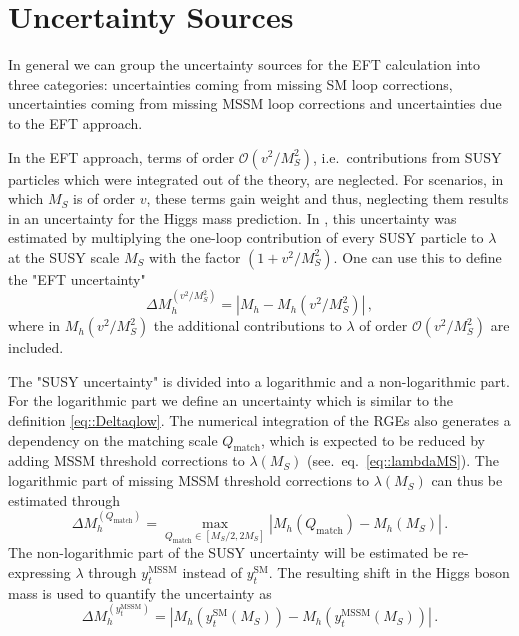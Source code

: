 \documentclass[a4paper,12pt]{book}
\begin{document}
\section{Uncertainty Sources}
In general we can group the uncertainty sources for the EFT calculation into three categories: uncertainties coming from missing SM loop corrections, uncertainties coming from missing MSSM loop corrections and uncertainties due to the EFT approach.\par 
In the EFT approach, terms of order $\mathcal{O}(v^2/M_S^2)$, i.e.\ contributions from SUSY particles which were integrated out of the theory, are neglected. For scenarios, in which $M_S$ is of order $v$, these terms gain weight and thus, neglecting them results in an uncertainty for the Higgs mass prediction. In \cite{susyhd}, this uncertainty was estimated by multiplying the one-loop contribution of every SUSY particle to $\lambda$ at the SUSY scale $M_S$ with the factor $(1+v^2/M_S^2)$. One can use this to define the "EFT uncertainty" 
\begin{equation}
\label{eq::DeltaEFT}
\Delta M_h^{(v^2/M_S^2)}=|M_h - M_h(v^2/M_S^2)|\,,
\end{equation}
where in $M_h(v^2/M_S^2)$ the additional contributions to $\lambda$ of order $\mathcal{O}(v^2/M_S^2)$ are included. \par 
The "SUSY uncertainty" is divided into a logarithmic and a non-logarithmic part. For the logarithmic part we define an uncertainty which is similar to the definition \eqref{eq::Deltaqlow}. The numerical integration of the RGEs also generates a dependency on the matching scale $Q_\text{match}$, which is expected to be reduced by adding MSSM threshold corrections to $\lambda(M_S)$ (see.\ eq.\ \eqref{eq::lambdaMS}). The logarithmic part of missing MSSM threshold corrections to $\lambda(M_S)$ can thus be estimated through 
\begin{equation}
\label{eq::Deltaqmatch}
\Delta M_h^{(Q_\text{match})}= \max_{Q_\text{match} \in [M_S/2,2 M_S]} |M_h(Q_\text{match}) - M_h(M_S)|\,.
\end{equation}
The non-logarithmic part of the SUSY uncertainty will be estimated be re-expressing $\lambda$ through $y_t^\text{MSSM}$ instead of $y_t^\text{SM}$. The resulting shift in the Higgs boson mass is used to quantify the uncertainty as
\begin{equation}
\label{eq::Deltaytmssm}
\Delta M_h^{(y_t^\text{MSSM})}= |M_h(y_t^\text{SM}(M_S)) - M_h(y_t^{\text{MSSM}}(M_S))|\,.
\end{equation}\par
\end{document}
